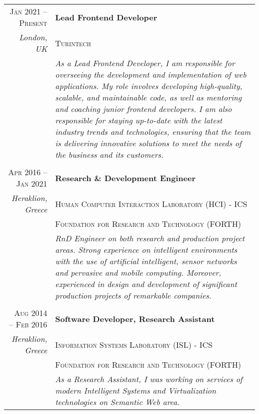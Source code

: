 \documentclass[11pt]{article}
\begin{document}
\begin{longtable}{r|p{12.5cm}}

\textsc{Jan 2021 – Present} & \textbf{Lead Frontend Developer} \\
\footnotesize{\textit{London, UK}} & \textsc{Turintech } \\
& \footnotesize{\textit{As a Lead Frontend Developer, I am responsible for overseeing the development and implementation of web applications. My role involves developing high-quality, scalable, and maintainable code, as well as mentoring and coaching junior frontend developers. I am also responsible for staying up-to-date with the latest industry trends and technologies, ensuring that the team is delivering innovative solutions to meet the needs of the business and its customers.}} \\

\multicolumn{2}{c}{} \\
\textsc{Apr 2016 – Jan 2021} & \textbf{Research \& Development Engineer} \\
\footnotesize{\textit{Heraklion, Greece}} & \textsc{Human Computer Interaction Laboratory (HCI) - ICS } \\
& \textsc{Foundation for Research and Technology (FORTH)} \\
& \footnotesize{\textit{RnD Engineer on both research and production project areas. Strong experience on intelligent environments with the use of artificial intelligent, sensor networks and pervasive and mobile computing. Moreover, experienced in design and development of significant production projects of remarkable companies.}} \\

\multicolumn{2}{c}{} \\
\textsc{Aug 2014 – Feb 2016} & \textbf{Software Developer, Research Assistant} \\
\footnotesize{\textit{Heraklion, Greece}} & \textsc{Information Systems Laboratory (ISL) - ICS } \\
& \textsc{Foundation for Research and Technology (FORTH)} \\
& \footnotesize{\textit{As a Research Assistant, I was working on services of modern Intelligent Systems and Virtualization technologies on Semantic Web area.}} \\



\end{longtable}
\end{document}
